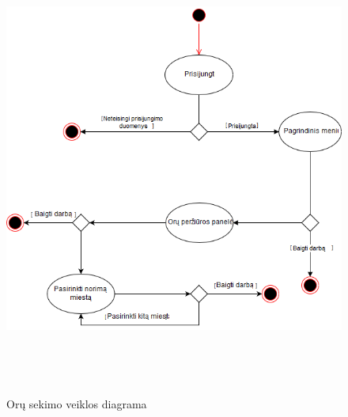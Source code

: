 \documentclass[oneside]{VUMIFPSkursinis}
\begin{document}
	\begin{figure}[H]
	\centering	
	\includegraphics[width=15cm,height=15cm,keepaspectratio]{veiklos_diagrama_orai.png}
	\caption{Orų sekimo veiklos diagrama}
	\label{}
	\end{figure}
\end{document}
